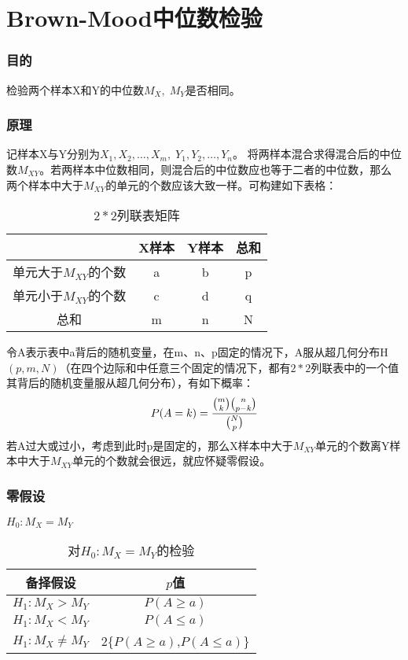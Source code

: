 \section{Brown-Mood中位数检验}

\subsubsection{目的}
检验两个样本X和Y的中位数$M_X,\;M_Y$是否相同。
\subsubsection{原理}
记样本X与Y分别为$X_1,X_2,\dots,X_m,\;Y_1,Y_2,\dots,Y_n$。
将两样本混合求得混合后的中位数$M_{XY}$。若两样本中位数相同，则混合后的中位数应也等于二者的中位数，那么两个样本中大于$M_{XY}$的单元的个数应该大致一样。可构建如下表格：

\begin{table}[htbp]
	\centering
	\begin{tabular}{cccc}
		\toprule 
		 & X样本 & Y样本 & 总和 \\
		\midrule 
		单元大于$M_{XY}$的个数 & a & b & p \\
		单元小于$M_{XY}$的个数 & c & d & q \\
		总和                  & m & n & N \\
		\bottomrule 
	\end{tabular}
	\caption{$2*2$列联表矩阵}
\end{table}

令A表示表中a背后的随机变量，在m、n、p固定的情况下，A服从超几何分布H$(p,m,N)$（在四个边际和中任意三个固定的情况下，都有$2*2$列联表中的一个值其背后的随机变量服从超几何分布），有如下概率：
\begin{equation}
	P(A=k)=\frac{\binom{m}{k}\binom{n}{p-k}}{\binom{N}{p}}\notag
\end{equation}
\hspace{2em}若A过大或过小，考虑到此时p是固定的，那么X样本中大于$M_{XY}$单元的个数离Y样本中大于$M_{XY}$单元的个数就会很远，就应怀疑零假设。
\subsubsection{零假设}
$H_0:M_X=M_Y$

\begin{table}[htbp]
	\centering
	\begin{tabular}{cc}
		\toprule
		备择假设 & $p$值 \\
		\midrule 
		$H_1:M_X>M_Y$ & $P(A\geqslant a)$ \\
		$H_1:M_X<M_Y$ & $P(A\leqslant a)$ \\
		$H_1:M_X\ne M_Y$ & 2\text{min}\{$P(A\geqslant a)$,\;$P(A\leqslant a)$\} \\
		\bottomrule 
	\end{tabular}
	\caption{对$H_0:M_X=M_Y$的检验}
\end{table}


